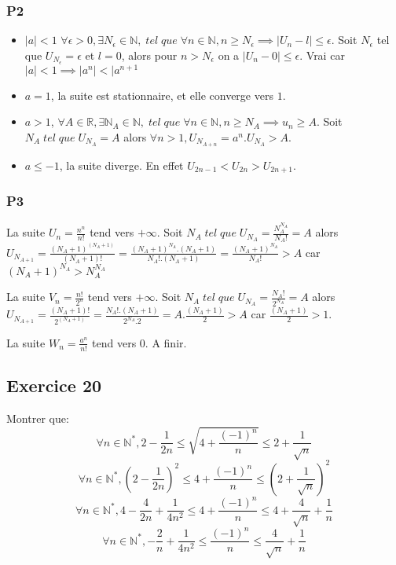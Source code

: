 \documentclass[]{book}
\theoremstyle{definition}
\newcommand{\bb}[1]{\mathbb{#1}}
\newcommand{\R}{\bb{R}}
\newcommand{\N}{\bb{N}}
\begin{document}
\subsubsection*{P2}
\begin{itemize}
\item $|a|< 1$ $\forall \epsilon > 0, \exists N_{\epsilon} \in \N, \; tel\; que\; \forall n \in \N, n \ge N_{\epsilon} \implies | U_n - l| \le \epsilon$. Soit $N_{\epsilon}$ tel que $U_{N_{\epsilon}} = \epsilon$ et $l=0$, alors pour $n>N_{\epsilon}$ on a $| U_n - 0| \le \epsilon$. Vrai car $|a|<1 \implies |a^n|<|a^{n+1}$
\item $a = 1$, la suite est stationnaire, et elle converge vers $1$.
\item $a > 1$, $\forall A \in \R, \exists \N_{A} \in \N, \; tel\; que\; \forall n \in \N, n \ge N_{A} \implies u_n \ge A$. Soit $N_{A}\; tel\; que\; U_{N_{A}} = A$ alors $\forall n > 1, U_{N_{A+n}} = a^n.U_{N_{A}} > A$.
\item $a \leq -1$, la suite diverge. En effet $U_{2n-1}<U_{2n}>U_{2n+1}$.
\end{itemize}

\subsubsection*{P3}
La suite $U_n = \frac{n^n}{n!}$ tend vers $+\infty$. Soit $N_{A}\; tel\; que\; U_{N_{A}} = \frac{N_{A}^{N_{A}}}{N_{A}!} = A$ alors $U_{N_{A+1}} = \frac{(N_{A}+1)^{(N_{A}+1)}}{(N_{A}+1)!} = \frac{(N_{A}+1)^{N_{A}}.(N_{A}+1)}{N_{A}!.(N_{A}+1)} = \frac{(N_{A}+1)^{N_{A}}}{N_{A}!} > A$ car $(N_{A}+1)^{N_{A}} > N_{A}^{N_{A}}$  



La suite $V_n = \frac{n!}{2^n}$ tend vers $+\infty$. Soit $N_{A}\; tel\; que\; U_{N_{A}} = \frac{N_{A}!}{2^{N_{A}}} = A$ alors $U_{N_{A+1}} = \frac{(N_{A}+1)!}{2^{(N_{A}+1)}} = \frac{N_{A}!.(N_{A}+1)}{2^{N_{A}}.2} = A.\frac{(N_{A}+1)}{2} > A$ car $\frac{(N_{A}+1)}{2} > 1$.  



La suite $W_n = \frac{a^n}{n!}$ tend vers $0$. A finir.  



\subsection*{Exercice 20}
Montrer que:
$$ \forall n \in \N^{*}, 2 - \frac{1}{2n} \leq \sqrt{4+\frac{(-1)^n}{n}} \leq 2 + \frac{1}{\sqrt{n}}$$
$$ \forall n \in \N^{*}, (2 - \frac{1}{2n})^2 \leq 4+\frac{(-1)^n}{n} \leq (2 + \frac{1}{\sqrt{n}})^2$$
$$ \forall n \in \N^{*}, 4 - \frac{4}{2n} + \frac{1}{4n^2} \leq 4+\frac{(-1)^n}{n} \leq 4 + \frac{4}{\sqrt{n}} +\frac{1}{n}$$
$$ \forall n \in \N^{*}, - \frac{2}{n} + \frac{1}{4n^2} \leq \frac{(-1)^n}{n} \leq \frac{4}{\sqrt{n}} +\frac{1}{n}$$
\end{document}
